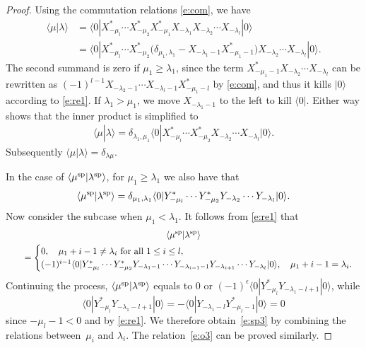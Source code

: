 \documentclass[pdftex]{sigma}
\numberwithin{equation}{section}
\begin{document}
\begin{proof}
Using the commutation relations \eqref{e:com}, we have
\begin{align*}
\langle\mu|\lambda\rangle &= \langle 0|X^*_{-\mu_l}\cdots X^*_{-\mu_2}X^*_{-\mu_1}X_{-\lambda_1}X_{-\lambda_2}\cdots X_{-\lambda_l}|0\rangle\\
&= \langle 0|X^*_{-\mu_l}\cdots X^*_{-\mu_2}\big(\delta_{\mu_1,\lambda_1}-X_{-\lambda_1-1}X^*_{-\mu_1-1}\big)X_{-\lambda_2}\cdots X_{-\lambda_l}|0\rangle.
\end{align*}
The second summand is zero if $\mu_1\geq\lambda_1$, since the term $X^*_{-\mu_1-1}X_{-\lambda_2}\cdots X_{-\lambda_l}$ can be rewritten as $(-1)^{l-1}X_{-\lambda_2-1}\cdots X_{-\lambda_l-1}X^*_{-\mu_1-l}$ by \eqref{e:com}, and thus it
kills $|0\rangle$ according to \eqref{e:re1}. If $\lambda_1>\mu_1$, we move $X_{-\lambda_1-1}$ to the left
to kill $\langle 0|$. Either way shows that the inner product is simplified
to
\begin{align*}
\langle\mu|\lambda\rangle=\delta_{\lambda_1,\mu_1}\langle 0|X^*_{-\mu_l}\cdots X^*_{-\mu_2}X_{-\lambda_2}\cdots X_{-\lambda_l}|0\rangle.
\end{align*}
Subsequently $\langle\mu|\lambda\rangle=\delta_{\lambda\mu}$.

In the case of $\langle \mu^{\rm sp}|\lambda^{\rm sp}\rangle$, for $\mu_1\geq\lambda_1$ we also have that
\begin{align*}
\langle \mu^{\rm sp}|\lambda^{\rm sp}\rangle=\delta_{\mu_1,\lambda_1}\langle 0|Y^*_{-\mu_l}\cdots Y^*_{-\mu_2}Y_{-\lambda_2}\cdots Y_{-\lambda_l}|0\rangle.
\end{align*}
Now consider the subcase when $\mu_1<\lambda_1$. It follows from \eqref{e:re1} that
\begin{gather*}
\langle \mu^{\rm sp}|\lambda^{\rm sp}\rangle\\
\qquad=\begin{cases}
0, \quad \mu_1+i-1\neq \lambda_i \ \text{for all} \ 1\leq i\leq l,\\
(-1)^{i-1}\langle 0|Y^*_{-\mu_l}\cdots Y^*_{-\mu_2}Y_{-\lambda_1-1}\cdots Y_{-\lambda_{i-1}-1}Y_{-\lambda_{i+1}} \cdots Y_{-\lambda_l}|0\rangle, \quad \mu_1+i-1= \lambda_i.
\end{cases}\!
\end{gather*}
Continuing the process, $\langle \mu^{\rm sp}|\lambda^{\rm sp}\rangle$ equals to 0 or $(-1)^\epsilon\langle 0|Y^*_{-\mu_l}Y_{-\lambda_1-l+1}|0\rangle$, while
\[
\langle 0|Y^*_{-\mu_l}Y_{-\lambda_1-l+1}|0\rangle=-\langle 0|Y_{-\lambda_1-l}Y^*_{-\mu_l-1}|0\rangle=0
\]
 since $-\mu_l-1<0$ and by \eqref{e:re1}. We therefore obtain~\eqref{e:sp3} by combining the relations between~$\mu_i$ and $\lambda_i$. The relation~\eqref{e:o3} can be proved similarly.
\end{proof}
\end{document}
